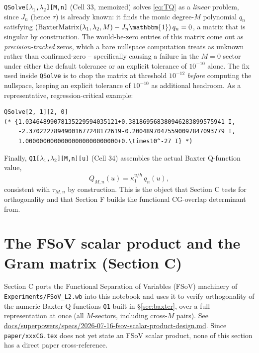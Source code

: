\documentclass[11pt]{article}
\begin{document}
\texttt{QSolve[$\lambda_1$,$\lambda_2$][M,n]} (Cell 33, memoized) solves \eqref{eq:TQ} as a
\emph{linear} problem, since $J_n$ (hence $\tau$) is already known: it finds the monic degree-$M$
polynomial $q_n$ satisfying $(\mathrm{BaxterMatrix}(\lambda_1,\lambda_2,M) - J_n\mathbbm{1})\, q_n = 0$,
a matrix that is singular by construction. The would-be-zero entries of this matrix come out as
\emph{precision-tracked} zeros, which a bare nullspace computation treats as unknown rather than
confirmed-zero -- specifically causing a failure in the $M=0$ sector under either the default
tolerance or an explicit tolerance of $10^{-10}$ alone. The fix used inside \texttt{QSolve} is to
chop the matrix at threshold $10^{-12}$ \emph{before} computing the nullspace, keeping an explicit
tolerance of $10^{-10}$ as additional headroom. As a representative, regression-critical example:
\begin{verbatim}
QSolve[2, 1][2, 0]
(* {1.03464899078135229594035121+0.381869568380946283899575941 I,
    -2.37022278949001677248172619-0.20048970475590097847093779 I,
    1.00000000000000000000000000+0.\times10^-27 I} *)
\end{verbatim}
Finally, \texttt{Q1[$\lambda_1$,$\lambda_2$][M,n][u]} (Cell 34) assembles the actual Baxter
Q-function value,
\[
  Q_{M,n}(u) = \kappa_1^{u/h}\, q_n(u),
\]
consistent with $\tau_{M,n}$ by construction. This is the object that Section C tests for
orthogonality and that Section F builds the functional CG-overlap determinant from.

\section{The FSoV scalar product and the Gram matrix (Section C)}
\label{sec:fsov}

Section C ports the Functional Separation of Variables (FSoV) machinery of
\texttt{Experiments/FSoV\_L2.wb} into this notebook and uses it to verify orthogonality of the
numeric Baxter Q-functions \texttt{Q1} built in \S\ref{sec:baxter}, over a full representation at
once (all $M$-sectors, including cross-$M$ pairs). See
\url{docs/superpowers/specs/2026-07-16-fsov-scalar-product-design.md}. Since
\texttt{paper/xxxCG.tex} does not yet state an FSoV scalar product, none of this section has a
direct paper cross-reference.
\end{document}
